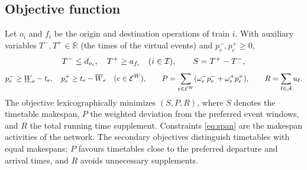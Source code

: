 \subsection{Objective function}
Let $o_i$ and $f_i$ be the origin and destination operations of train $i$. With auxiliary variables $T^-,T^+\in\mathbb{R}$ (the times of the virtual events) and $p^-_e,p^+_e\ge0$,
\begin{equation}
T^-\le d_{o_i},\quad T^+\ge a_{f_i}\quad(i\in\mathcal{I}),\qquad S=T^+-T^-,\label{eq:span}
\end{equation}
\begin{equation}
p^-_e\ge\underline{W}_e-t_e,\quad p^+_e\ge t_e-\overline{W}_e\quad(e\in\mathcal{E}^W),\qquad P=\sum_{e\in\mathcal{E}^W}(\omega^-_ep^-_e+\omega^+_ep^+_e),\qquad R=\sum_{\ell\in\mathcal{A}}u_\ell.\label{eq:pr}
\end{equation}
The objective lexicographically minimizes $(S,P,R)$, where $S$ denotes the timetable makespan, $P$ the weighted deviation from the preferred event windows, and $R$ the total running time supplement. Constraints \eqref{eq:span} are the makespan activities of the network. The secondary objectives distinguish timetables with equal makespans; $P$ favours timetables close to the preferred departure and arrival times, and $R$ avoids unnecessary supplements.

